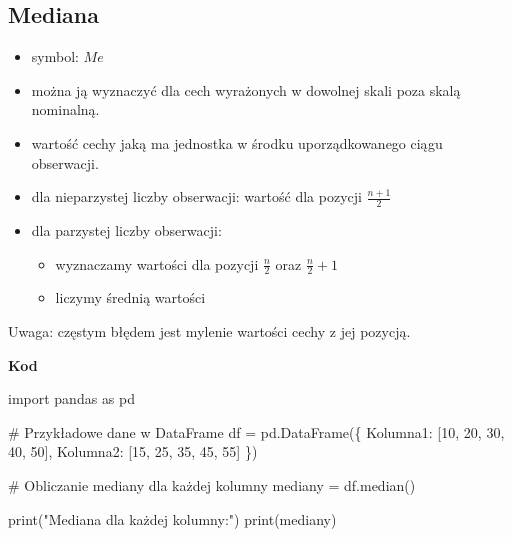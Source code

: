 \documentclass[
  polish,
  letterpaper,
  DIV=11,
  numbers=noendperiod]{scrreprt}
\newenvironment{Shaded}{\begin{snugshade}}{\end{snugshade}}
\newcommand{\BuiltInTok}[1]{\textcolor[rgb]{0.00,0.23,0.31}{#1}}
\newcommand{\CommentTok}[1]{\textcolor[rgb]{0.37,0.37,0.37}{#1}}
\newcommand{\DecValTok}[1]{\textcolor[rgb]{0.68,0.00,0.00}{#1}}
\newcommand{\ImportTok}[1]{\textcolor[rgb]{0.00,0.46,0.62}{#1}}
\newcommand{\NormalTok}[1]{\textcolor[rgb]{0.00,0.23,0.31}{#1}}
\newcommand{\OperatorTok}[1]{\textcolor[rgb]{0.37,0.37,0.37}{#1}}
\newcommand{\StringTok}[1]{\textcolor[rgb]{0.13,0.47,0.30}{#1}}
\providecommand{\tightlist}{%
  \setlength{\itemsep}{0pt}\setlength{\parskip}{0pt}}
\begin{document}
\subsection{Mediana}\label{mediana}

\begin{itemize}
\tightlist
\item
  symbol: \(Me\)
\item
  można ją wyznaczyć dla cech wyrażonych w dowolnej skali poza skalą
  nominalną.
\item
  wartość cechy jaką ma jednostka w środku uporządkowanego ciągu
  obserwacji.
\item
  dla nieparzystej liczby obserwacji: wartość dla pozycji
  \(\frac{n+1}{2}\)
\item
  dla parzystej liczby obserwacji:

  \begin{itemize}
  \tightlist
  \item
    wyznaczamy wartości dla pozycji \(\frac{n}{2}\) oraz
    \(\frac{n}{2}+1\)
  \item
    liczymy średnią wartości
  \end{itemize}
\end{itemize}

Uwaga: częstym błędem jest mylenie wartości cechy z jej pozycją.

\textbf{Kod}

\begin{Shaded}
\begin{Highlighting}[]
\ImportTok{import}\NormalTok{ pandas }\ImportTok{as}\NormalTok{ pd}

\CommentTok{\# Przykładowe dane w DataFrame}
\NormalTok{df }\OperatorTok{=}\NormalTok{ pd.DataFrame(\{}
    \StringTok{\textquotesingle{}Kolumna1\textquotesingle{}}\NormalTok{: [}\DecValTok{10}\NormalTok{, }\DecValTok{20}\NormalTok{, }\DecValTok{30}\NormalTok{, }\DecValTok{40}\NormalTok{, }\DecValTok{50}\NormalTok{],}
    \StringTok{\textquotesingle{}Kolumna2\textquotesingle{}}\NormalTok{: [}\DecValTok{15}\NormalTok{, }\DecValTok{25}\NormalTok{, }\DecValTok{35}\NormalTok{, }\DecValTok{45}\NormalTok{, }\DecValTok{55}\NormalTok{]}
\NormalTok{\})}

\CommentTok{\# Obliczanie mediany dla każdej kolumny}
\NormalTok{mediany }\OperatorTok{=}\NormalTok{ df.median()}

\BuiltInTok{print}\NormalTok{(}\StringTok{"Mediana dla każdej kolumny:"}\NormalTok{)}
\BuiltInTok{print}\NormalTok{(mediany)}
\end{Highlighting}
\end{Shaded}
\end{document}
